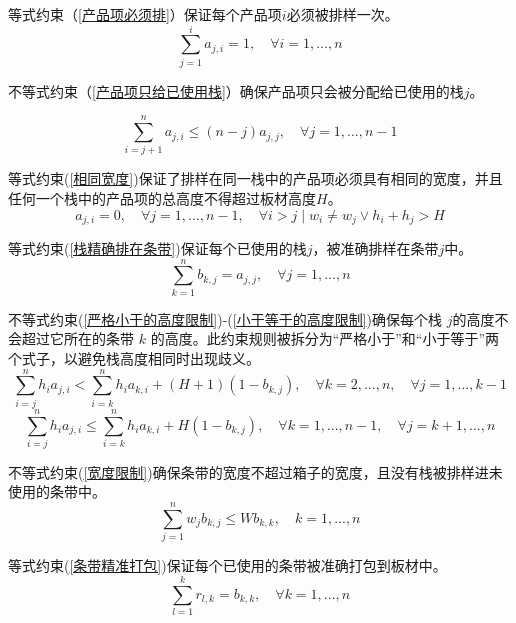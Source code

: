 \documentclass[bwprint]{gmcmthesis}
\begin{document}
等式约束（\ref{产品项必须排}）保证每个产品项$i$必须被排样一次。
\begin{equation}
    \sum_{j=1}^{i}  a_{j,i} =1,\quad \forall i=1,...,n \label{产品项必须排}
\end{equation}

不等式约束（\ref{产品项只给已使用栈}）确保产品项只会被分配给已使用的栈$j$。

\begin{equation}
   \sum_{i=j+1}^{n}  a_{j,i} \le (n-j)a_{j,j},\quad \forall j=1,...,n-1  \label{产品项只给已使用栈}
\end{equation}

等式约束(\ref{相同宽度})保证了排样在同一栈中的产品项必须具有相同的宽度，并且任何一个栈中的产品项的总高度不得超过板材高度$H$。
\begin{equation}
     a_{j,i}=0, \quad \forall j=1,...,n-1,\quad  \forall i>j \mid w_i \neq w_j \vee h_i+h_j>H \label{相同宽度}
 \end{equation}

 等式约束(\ref{栈精确排在条带})保证每个已使用的栈$j$，被准确排样在条带$j$中。
\begin{equation}
    \sum_{k=1}^{n}  b_{k,j} =a_{j,j},\quad \forall j=1,...,n  \label{栈精确排在条带}
\end{equation}

不等式约束(\ref{严格小于的高度限制})-(\ref{小于等于的高度限制})确保每个栈 $j$的高度不会超过它所在的条带 $k$ 的高度。此约束规则被拆分为“严格小于”和“小于等于”两个式子，以避免栈高度相同时出现歧义。
\begin{equation}
    \sum_{i=j}^{n} h_ia_{j,i}<\sum_{i=k}^n h_i a_{k,i}+(H+1)(1-b_{k,j}),\quad  \forall  k=2,...,n,\quad  \forall j=1,...,k-1 \label{严格小于的高度限制}
\end{equation}
\begin{equation}
    \sum_{i=j}^{n} h_ia_{j,i} \le \sum_{i=k}^n h_i a_{k,i}+H(1-b_{k,j}), \quad  \forall k=1,...,n-1, \quad \forall j=k+1,...,n \label{小于等于的高度限制}
\end{equation}

不等式约束(\ref{宽度限制})确保条带的宽度不超过箱子的宽度，且没有栈被排样进未使用的条带中。
\begin{equation}
    \sum_{j=1}^{n} w_j b_{k,j} \le W b_{k,k}, \quad k=1,...,n \label{宽度限制}
\end{equation}

等式约束(\ref{条带精准打包})保证每个已使用的条带被准确打包到板材中。
\begin{equation}
    \sum_{l=1}^{k} r_{l,k} = b_{k,k}, \quad \forall k=1,...,n \label{条带精准打包}
\end{equation}
\end{document}
